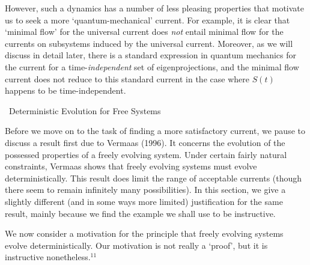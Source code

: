 \documentclass[12pt]{article}
\renewcommand{\subsection}[1]{\addtocounter{subsection}{1}
                           \setcounter{subsubsection}{0}
                           \vspace{20pt}
                           \begin{center}
                           \thesubsection \ #1
                           \end{center}
                           \vspace{20pt}}
\begin{document}
However, such a dynamics has a number of less pleasing properties that 
motivate us to seek a more `quantum-mechanical' current.  For example, 
it is clear that `minimal flow' for the universal current does {\it 
not} entail minimal flow for the currents on subsystems induced by the 
universal current.  Moreover, as we will discuss in detail later, 
there is a standard expression in quantum mechanics for the current 
for a time-{\it independent} set of eigenprojections, and the minimal 
flow current does not reduce to this standard current in the case 
where $S(t)$ happens to be time-independent.



\subsection{Deterministic Evolution for Free Systems}


Before we move on to the task of finding a more satisfactory current, 
we pause to discuss a result first due to Vermaas (1996).  It concerns 
the evolution of the possessed properties of a freely evolving system.  
Under certain fairly natural constraints, Vermaas shows that freely 
evolving systems must evolve deterministically.  This result does 
limit the range of acceptable currents (though there seem to remain 
infinitely many possibilities).  In this section, we give a slightly 
different (and in some ways more limited) justification for the same 
result, mainly because we find the example we shall use to be 
instructive.

We now consider a motivation for the principle that freely evolving 
systems evolve deterministically.  Our motivation is not really a 
`proof', but it is instructive nonetheless.$^{11}$
\end{document}
